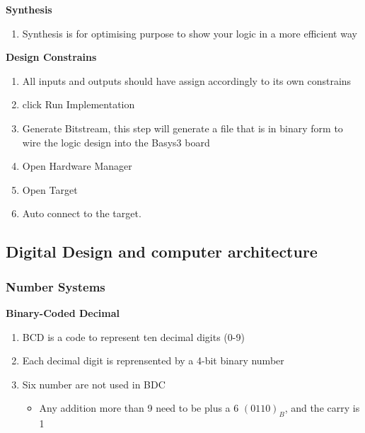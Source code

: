 \documentclass{article}
\begin{document}
\textbf{Synthesis}
\begin{enumerate}
    \item Synthesis is for optimising purpose to show your logic in a more efficient way
\end{enumerate}
\textbf{Design Constrains}
\begin{enumerate}
    \item All inputs and outputs should have assign accordingly to its own constrains
    \item click Run Implementation
    \item Generate Bitstream, this step will generate a file that is in binary form to wire the logic design into the Basys3 board
    \item Open Hardware Manager
    \item Open Target
    \item Auto connect to the target.
\end{enumerate}

\newpage
\subsection{Digital Design and computer architecture}
\subsubsection{Number Systems}
\textbf{Binary-Coded Decimal}
\begin{enumerate}
    \item BCD is a code to represent ten decimal digits (0-9)
    \item Each decimal digit is reprensented by a 4-bit binary number
    \item Six number are not used in BDC
        \begin{itemize}
            \item Any addition more than 9 need to be plus a 6 $(0110)_{B}$, and the carry is 1
        \end{itemize}
    
\end{enumerate}
\end{document}
